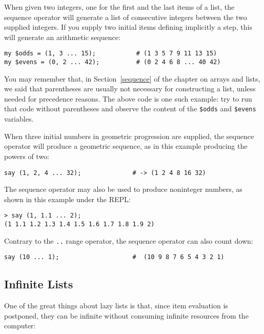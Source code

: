 When given two integers, one for the first and the last items of 
a list, the sequence operator will generate a list of consecutive 
integers between the two supplied integers. If you supply two 
initial items defining implicitly a step, this will generate 
an arithmetic sequence:

\begin{verbatim}
my $odds = (1, 3 ... 15);           # (1 3 5 7 9 11 13 15)
my $evens = (0, 2 ... 42);          # (0 2 4 6 8 ... 40 42)
\end{verbatim}

You may remember that, in Section~\ref{sequence} of the chapter 
on arrays and lists, we said that parentheses are usually not 
necessary for constructing a list, unless needed for 
precedence reasons. The above code is one such example: try 
to run that code without parentheses and observe the content 
of the \verb'$odds' and \verb'$evens' variables.

When three initial numbers in geometric progression are supplied, the 
sequence operator will produce a geometric sequence, as in 
this example producing the powers of two:

\begin{verbatim}
say (1, 2, 4 ... 32);              # -> (1 2 4 8 16 32)
\end{verbatim}

The sequence operator may also be used to produce noninteger 
numbers, as shown in this example under the REPL:

\begin{verbatim}
> say (1, 1.1 ... 2);
(1 1.1 1.2 1.3 1.4 1.5 1.6 1.7 1.8 1.9 2)
\end{verbatim}

Contrary to the \verb'..' range operator, the sequence 
operator can also count down:

\begin{verbatim}
say (10 ... 1);                    #  (10 9 8 7 6 5 4 3 2 1)
\end{verbatim}

\subsection{Infinite Lists}

One of the great things about lazy lists is that, since 
item evaluation is postponed, they can be infinite without 
consuming infinite resources from the computer:

